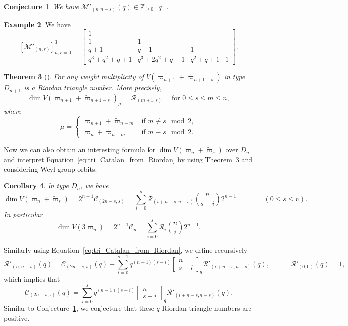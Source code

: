 \documentclass[11pt, leqno]{amsart}
\theoremstyle{plain}
\newtheorem{theorem}{Theorem}[section]
\newtheorem{corollary}[theorem]{Corollary}
\newtheorem{conjecture}[theorem]{Conjecture}
\theoremstyle{definition}
\newtheorem{example}[theorem]{Example}
\numberwithin{equation}{section}
\newcommand{\fw}{\varpi} %
\newcommand{\tfw}{\widetilde{\fw}} %
\newcommand{\Cat}{\mathcal{C}} %
\newcommand{\Mot}{\mathcal{M}} %
\newcommand{\Rior}{\mathcal{R}} %
\newcommand{\qbinom}[3]{\left[ \begin{matrix} #1 \\ #2 \end{matrix} \right]_{#3}} %
\newcommand{\Z}{\mathbb{Z}}
\begin{document}
\begin{conjecture}
\label{conj:q_natural_motzkin_tri}
We have $\Mot'_{(n,n-s)}(q) \in \Z_{\geq 0}[q]$.
\end{conjecture}

\begin{example}
We have
\[
[ \Mot'_{(n,r)} ]_{n,r=0}^3 =
\begin{bmatrix}
 1 \\
 1 & 1 \\
 q + 1 & q + 1 & 1 \\
 q^3 + q^2 + q + 1 & q^3 + 2q^2 + q + 1 & q^2 + q + 1 & 1
\end{bmatrix}.
\]
\end{example}

\begin{theorem}[{\cite{KLO17}}]
\label{thm: wt Riordan}
For any weight multiplicity of $V(\fw_{n+1}+\tfw_{n+1-s})$ in type $D_{n+1}$ is a Riordan triangle number. More precisely,
\[
\dim V(\fw_{n+1}+\tfw_{n+1-s})_{\mu} = \Rior_{(m+1,s)} \quad \text{ for } 0 \le s\le m \le n,
\]
where
\[
\mu = \begin{cases}
\fw_{n+1}+\tfw_{n-m} & \text{if } m \not\equiv s \mod{2}, \\
\fw_{n}+\tfw_{n-m} & \text{if } m \equiv s \mod{2}.
\end{cases}
\]
\end{theorem}

Now we can also obtain an interesting formula for $\dim V(\fw_n + \tfw_s)$ over $D_n$ and interpret Equation~\eqref{eq:tri_Catalan_from_Riordan} by using Theorem~\ref{thm: wt Riordan}
and considering Weyl group orbits:

\begin{corollary}
In type $D_n$, we have
\[
\dim V(\fw_n + \tfw_s) = 2^{n-1} \Cat_{(2n-s,s)} = \sum_{i=0}^s \Rior_{(i+n-s,n-s)}\binom{n}{s-i}2^{n-1}
\qquad\qquad (0 \le s \le n).
\]
In particular
\[
\dim V(3\fw_n) = 2^{n-1} \Cat_{n} = \sum_{i=0}^s \Rior_{i}\binom{n}{i}2^{n-1}.
\]
\end{corollary}

Similarly using Equation~\eqref{eq:tri_Catalan_from_Riordan}, we define recursively
\[
\Rior'_{(n,n-s)}(q) = \Cat_{(2n-s,s)}(q) - \sum_{i=0}^{s-1} q^{(n-1)(s-i)} \qbinom{n}{s-i}{q} \Rior'_{(i+n-s,n-s)}(q),
\qquad\quad
\Rior'_{(0,0)}(q) = 1,
\]
which implies that
\[
\Cat_{(2n-s,s)}(q) = \sum_{i=0}^s q^{(n-1)(s-i)} \qbinom{n}{s-i}{q} \Rior'_{(i+n-s,n-s)}(q).
\]
Similar to Conjecture~\ref{conj:q_natural_motzkin_tri}, we conjecture that these $q$-Riordan triangle numbers are positive.
\end{document}
